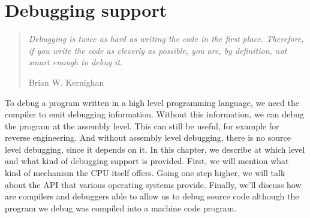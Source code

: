 \chapter{Debugging support}

\begin{quote}
  \textit{Debugging is twice as hard as writing the code in the first place.
    Therefore, if you write the code as cleverly as possible, you are, by
    definition, not smart enough to debug it.}\begin{flushright}
    \scriptsize{Brian W. Kernighan}
  \end{flushright}
\end{quote}

To debug a program written in a high level programming language, we need the
compiler to emit debugging information. Without this information, we can debug
the program at the assembly level. This can still be useful, for example for
reverse engineering. And without assembly level debugging, there is no source
level debugging, since it depends on it. In this chapter, we describe at which
level and what kind of debugging support is provided. First, we will mention
what kind of mechanism the CPU itself offers. Going one step higher, we will
talk about the API that various operating systems provide. Finally, we'll
discuss how are compilers and debuggers able to allow us to debug source code
although the program we debug was compiled into a machine code program.

